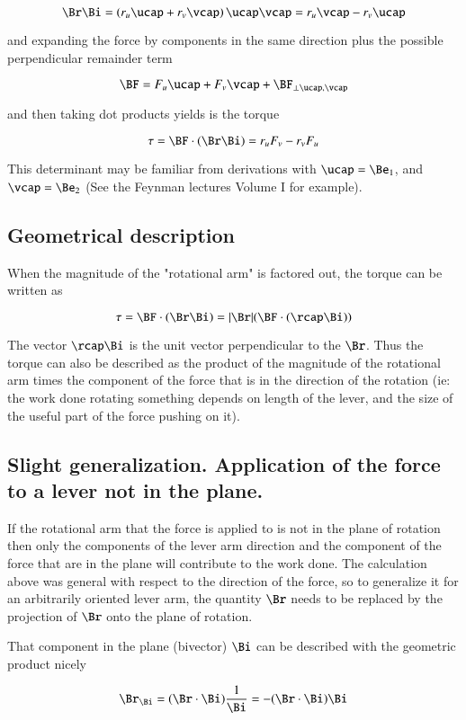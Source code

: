 \[
\Br \Bi =
\left(
r_u \ucap + r_v \vcap
\right)
\ucap \vcap
= 
r_u \vcap  
- r_v \ucap
\]

and expanding the force by components in the same direction plus the possible perpendicular remainder term

\[
\BF  = F_u \ucap + F_v \vcap + \BF _{\perp \ucap,\vcap}
\]

and then taking dot products yields is the torque

\[
\tau = \BF \cdot (\Br  \Bi ) = r_u F_v - r_v F_u
\]

This determinant may be familiar from derivations with $\ucap = \Be _1$, and $\vcap = \Be _2$ (See the Feynman lectures Volume I for example).

\subsection{Geometrical description }

When the magnitude of the "rotational arm" is factored out, the torque can be written as

\[
\tau = \BF \cdot (\Br  \Bi ) = |\Br |  (\BF \cdot (\rcap \Bi ))
\]

The vector $\rcap \Bi $ is the unit vector perpendicular to the $\Br$.  Thus the torque can also be described as the product of the magnitude of the rotational arm times the component of the force that is in the direction of the rotation (ie: the work done rotating something depends on length of the lever, and the size of the useful part of the force pushing on it).

\subsection{Slight generalization.  Application of the force to a lever not in the plane. }

If the rotational arm that the force is applied to is not in the plane of rotation then only the components of the lever arm direction and the component of the force that are in the plane will contribute to the work done.  The calculation above was general with respect to the direction of the force, so to generalize
it for an arbitrarily oriented lever arm, the quantity $\Br$ needs to be replaced by the projection of $\Br$ onto the plane of rotation.

That component in the plane (bivector) $\Bi$ can be described with the geometric product nicely

\[
\Br _{\Bi } =  (\Br  \cdot \Bi ) \frac{1}{\Bi } =  -(\Br  \cdot \Bi ) \Bi 
\]

